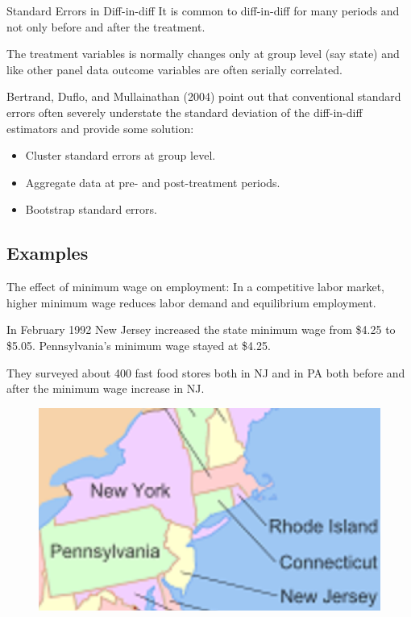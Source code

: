 \documentclass{beamer}
\begin{document}
\begin{frame}{Standard Errors in Diff-in-diff}
It is common to diff-in-diff for many periods and not only before and after the treatment.\medskip

The treatment variables is normally changes only at group level (say state) and like other panel data outcome variables are often serially correlated.\medskip

Bertrand, Duflo, and Mullainathan (2004) point out that conventional standard errors often severely understate the standard deviation of the diff-in-diff estimators and provide some solution:
\begin{itemize}
\item Cluster standard errors at group level.
\item Aggregate data at pre- and post-treatment periods.
\item Bootstrap standard errors.
\end{itemize}
\end{frame}

\subsection{Examples}
\begin{frame}{\cite{card1994minimum}}
The effect of minimum wage on employment: 
In a competitive labor market, higher minimum wage reduces labor demand and equilibrium employment.\medskip

In February 1992 New Jersey increased the state minimum wage from \$4.25 to \$5.05. Pennsylvania's minimum wage stayed at \$4.25.\medskip

They surveyed about 400 fast food stores both in NJ and in PA both before and after the minimum wage increase in NJ.
\begin{figure}
\centering
\includegraphics[width=0.4\linewidth]{./Figures/card-krueger}
\label{fig:card-krueger}
\end{figure}

\end{frame}
\end{document}
